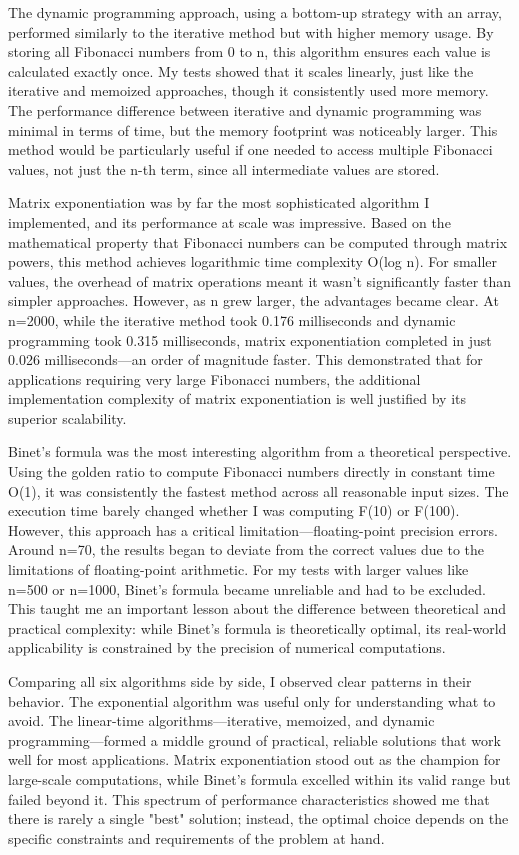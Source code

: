 \documentclass[12pt]{article}
\begin{document}
The dynamic programming approach, using a bottom-up strategy with an array, performed similarly to the iterative method but with higher memory usage. By storing all Fibonacci numbers from 0 to n, this algorithm ensures each value is calculated exactly once. My tests showed that it scales linearly, just like the iterative and memoized approaches, though it consistently used more memory. The performance difference between iterative and dynamic programming was minimal in terms of time, but the memory footprint was noticeably larger. This method would be particularly useful if one needed to access multiple Fibonacci values, not just the n-th term, since all intermediate values are stored.

Matrix exponentiation was by far the most sophisticated algorithm I implemented, and its performance at scale was impressive. Based on the mathematical property that Fibonacci numbers can be computed through matrix powers, this method achieves logarithmic time complexity O(log n). For smaller values, the overhead of matrix operations meant it wasn't significantly faster than simpler approaches. However, as n grew larger, the advantages became clear. At n=2000, while the iterative method took 0.176 milliseconds and dynamic programming took 0.315 milliseconds, matrix exponentiation completed in just 0.026 milliseconds—an order of magnitude faster. This demonstrated that for applications requiring very large Fibonacci numbers, the additional implementation complexity of matrix exponentiation is well justified by its superior scalability.

Binet's formula was the most interesting algorithm from a theoretical perspective. Using the golden ratio to compute Fibonacci numbers directly in constant time O(1), it was consistently the fastest method across all reasonable input sizes. The execution time barely changed whether I was computing F(10) or F(100). However, this approach has a critical limitation—floating-point precision errors. Around n=70, the results began to deviate from the correct values due to the limitations of floating-point arithmetic. For my tests with larger values like n=500 or n=1000, Binet's formula became unreliable and had to be excluded. This taught me an important lesson about the difference between theoretical and practical complexity: while Binet's formula is theoretically optimal, its real-world applicability is constrained by the precision of numerical computations.

Comparing all six algorithms side by side, I observed clear patterns in their behavior. The exponential algorithm was useful only for understanding what to avoid. The linear-time algorithms—iterative, memoized, and dynamic programming—formed a middle ground of practical, reliable solutions that work well for most applications. Matrix exponentiation stood out as the champion for large-scale computations, while Binet's formula excelled within its valid range but failed beyond it. This spectrum of performance characteristics showed me that there is rarely a single "best" solution; instead, the optimal choice depends on the specific constraints and requirements of the problem at hand.
\end{document}
